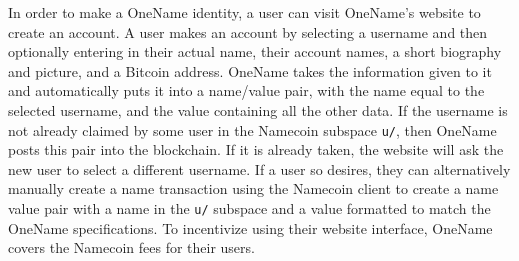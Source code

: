In order to make a OneName identity, a user can visit OneName's website to create an account. A user makes an account by selecting a username and then optionally entering in their actual name, their account names, a short biography and picture, and a Bitcoin address. OneName takes the information given to it and automatically puts it into a name/value pair, with the name equal to the selected username, and the value containing all the other data. If the username is not already claimed by some user in the Namecoin subspace {\tt u/}, then OneName posts this pair into the blockchain. If it is already taken, the website will ask the new user to select a different username. If a user so desires, they can alternatively manually create a name transaction using the Namecoin client to create a name value pair with a name in the {\tt u/} subspace and a value formatted to match the OneName specifications. To incentivize using their website interface, OneName covers the Namecoin fees for their users. 




